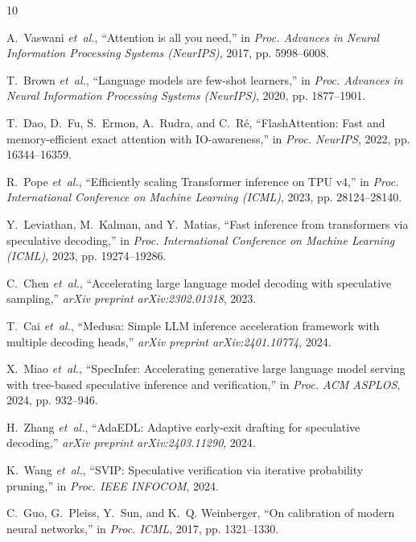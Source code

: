 \documentclass[journal,10pt,twocolumn]{IEEEtran}
\begin{document}
\balance
\begin{thebibliography}{10}

A.~Vaswani \textit{et~al.}, ``Attention is all you need,'' in \textit{Proc. Advances in Neural Information Processing Systems (NeurIPS)}, 2017, pp. 5998--6008.

T.~Brown \textit{et~al.}, ``Language models are few-shot learners,'' in \textit{Proc. Advances in Neural Information Processing Systems (NeurIPS)}, 2020, pp. 1877--1901.

T.~Dao, D.~Fu, S.~Ermon, A.~Rudra, and C.~R{\'e}, ``FlashAttention: Fast and memory-efficient exact attention with IO-awareness,'' in \textit{Proc. NeurIPS}, 2022, pp. 16344--16359.

R.~Pope \textit{et~al.}, ``Efficiently scaling Transformer inference on TPU v4,'' in \textit{Proc. International Conference on Machine Learning (ICML)}, 2023, pp. 28124--28140.

Y.~Leviathan, M.~Kalman, and Y.~Matias, ``Fast inference from transformers via speculative decoding,'' in \textit{Proc. International Conference on Machine Learning (ICML)}, 2023, pp. 19274--19286.

C.~Chen \textit{et~al.}, ``Accelerating large language model decoding with speculative sampling,'' \textit{arXiv preprint arXiv:2302.01318}, 2023.

T.~Cai \textit{et~al.}, ``Medusa: Simple LLM inference acceleration framework with multiple decoding heads,'' \textit{arXiv preprint arXiv:2401.10774}, 2024.

X.~Miao \textit{et~al.}, ``SpecInfer: Accelerating generative large language model serving with tree-based speculative inference and verification,'' in \textit{Proc. ACM ASPLOS}, 2024, pp. 932--946.

H.~Zhang \textit{et~al.}, ``AdaEDL: Adaptive early-exit drafting for speculative decoding,'' \textit{arXiv preprint arXiv:2403.11290}, 2024.

K.~Wang \textit{et~al.}, ``SVIP: Speculative verification via iterative probability pruning,'' in \textit{Proc. IEEE INFOCOM}, 2024.

C.~Guo, G.~Pleiss, Y.~Sun, and K.~Q. Weinberger, ``On calibration of modern neural networks,'' in \textit{Proc. ICML}, 2017, pp. 1321--1330.

\end{thebibliography}
\end{document}
